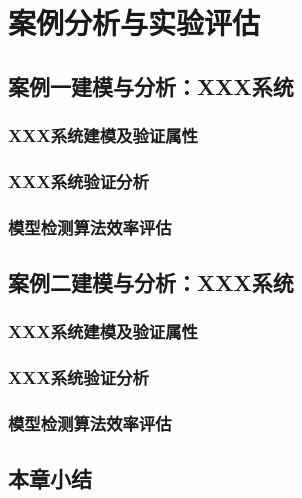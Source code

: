 \chapter{案例分析与实验评估}
\label{ch6}


\section{案例一建模与分析：XXX系统}

\subsection{XXX系统建模及验证属性}
\subsection{XXX系统验证分析}
\subsection{模型检测算法效率评估}

\section{案例二建模与分析：XXX系统}

\subsection{XXX系统建模及验证属性}
\subsection{XXX系统验证分析}
\subsection{模型检测算法效率评估}

\section{本章小结}
